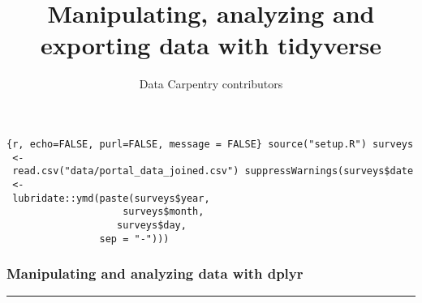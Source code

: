 \documentclass[]{article}
\title{Manipulating, analyzing and exporting data with tidyverse}
\author{Data Carpentry contributors}
\date{}
\begin{document}
\maketitle

\texttt{\{r,\ echo=FALSE,\ purl=FALSE,\ message\ =\ FALSE\}\ source("setup.R")\ surveys\ \textless{}-\ read.csv("data/portal\_data\_joined.csv")\ suppressWarnings(surveys\$date\ \textless{}-\ lubridate::ymd(paste(surveys\$year,\ \ \ \ \ \ \ \ \ \ \ \ \ \ \ \ \ \ \ \ \ \ \ \ \ \ \ \ \ \ \ \ \ \ \ \ \ \ \ \ \ \ \ \ \ \ \ \ \ \ \ \ \ \ \ surveys\$month,\ \ \ \ \ \ \ \ \ \ \ \ \ \ \ \ \ \ \ \ \ \ \ \ \ \ \ \ \ \ \ \ \ \ \ \ \ \ \ \ \ \ \ \ \ \ \ \ \ \ \ \ \ \ \ surveys\$day,\ \ \ \ \ \ \ \ \ \ \ \ \ \ \ \ \ \ \ \ \ \ \ \ \ \ \ \ \ \ \ \ \ \ \ \ \ \ \ \ \ \ \ \ \ \ \ \ \ \ \ \ \ \ \ sep\ =\ "-")))}

\subsubsection{Manipulating and analyzing data with
dplyr}\label{manipulating-and-analyzing-data-with-dplyr}

\begin{center}\rule{0.5\linewidth}{\linethickness}\end{center}
\end{document}
